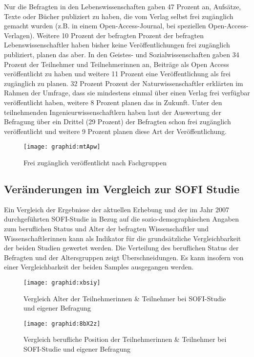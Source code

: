 Nur die Befragten in den Lebenswissenschaften gaben 47 Prozent an, Aufsätze, Texte oder Bücher publiziert zu haben, die vom Verlag selbst frei zugänglich gemacht wurden (z.B. in einem Open-Access-Journal, bei speziellen Open-Access-Verlagen). Weitere 10 Prozent der befragten Prozent der befragten Lebenswissenschaftler haben bisher keine Veröffentlichungen frei zugänglich publiziert, planen das aber. In den Geistes- und Sozialwissenschaften gaben 34 Prozent der Teilnehmer und Teilnehmerinnen an, Beiträge als Open Access veröffentlicht zu haben und weitere 11 Prozent eine Veröffentlichung als frei zugänglich zu planen. 32 Prozent Prozent der Naturwissenschaftler erklärten im Rahmen der Umfrage, dass sie mindestens einmal über einen Verlag frei verfügbar veröffentlicht haben, weitere 8 Prozent planen das in Zukunft. Unter den teilnehmenden Ingenieurwissenschaftlern haben laut der Auswertung der Befragung über ein Drittel  (29 Prozent) der Befragten schon frei zugänglich veröffentlicht und weitere 9 Prozent planen diese Art der Veröffentlichung.

\begin{figure}[h!]
\texttt{[image: graphid:mtApw]}
\caption{Frei zugänglich veröffentlicht nach Fachgruppen}
\end{figure}

\subsection{Veränderungen im Vergleich zur SOFI Studie}

Ein Vergleich der Ergebnisse der aktuellen Erhebung und der im Jahr 2007 durchgeführten SOFI-Studie in Bezug auf die sozio-demographischen Angaben zum beruflichen Status und Alter der befragten Wissenschaftler und Wissenschaftlerinnen kann als Indikator für die grundsätzliche Vergleichbarkeit der beiden Studien gewertet werden. Die Verteilung des beruflichen Status der Befragten und der Altersgruppen zeigt Überschneidungen. Es kann insofern von einer Vergleichbarkeit der beiden Samples ausgegangen werden.

\begin{figure}[h!]
\texttt{[image: graphid:xbsiy]}
\caption{Vergleich Alter der Teilnehmerinnen & Teilnehmer bei SOFI-Studie und eigener Befragung}
\end{figure}

\begin{figure}[h!]
\texttt{[image: graphid:8bX2z]}
\caption{Vergleich berufliche Position der Teilnehmerinnen & Teilnehmer bei SOFI-Studie und eigener Befragung}
\end{figure}

